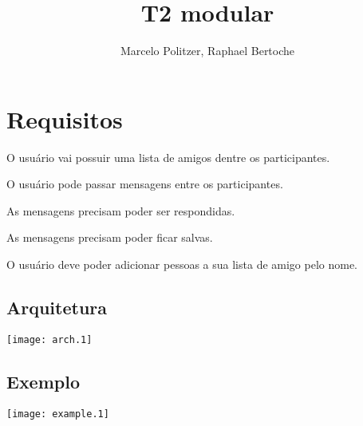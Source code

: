 \documentclass{article}
\title{T2 modular}
\author{Marcelo Politzer, Raphael Bertoche}
\begin{document}
\maketitle

\section{Requisitos}

\begin{list}{*}{}
\item O usuário vai possuir uma lista de amigos dentre os participantes.
\item O usuário pode passar mensagens entre os participantes.
\item As mensagens precisam poder ser respondidas.
\item As mensagens precisam poder ficar salvas.
\item O usuário deve poder adicionar pessoas a sua lista de amigo pelo nome.
\end{list}

\subsection{Arquitetura}
\texttt{[image: arch.1]}

\subsection{Exemplo}
\texttt{[image: example.1]}
\end{document}
